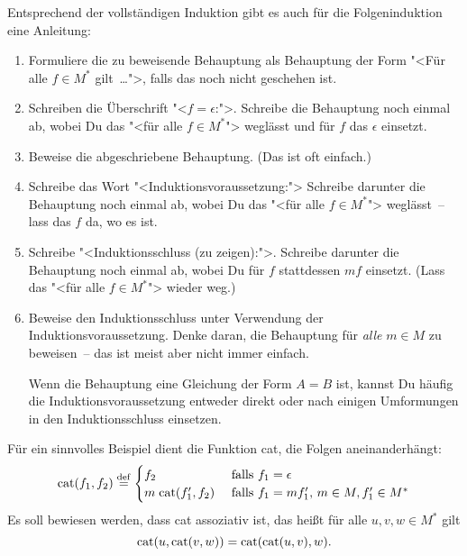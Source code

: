 Entsprechend der vollständigen Induktion gibt es auch für die
Folgeninduktion eine Anleitung:
%
\begin{enumerate}
\item Formuliere die zu beweisende Behauptung als Behauptung der
  Form "<Für alle $f\in M^\ast$ gilt~\ldots">, falls das noch nicht
  geschehen ist.
\item Schreiben die Überschrift "<$f = \epsilon$:">. Schreibe die
  Behauptung noch einmal ab, wobei Du das "<für alle $f\in M^\ast$"> weglässt und für $f$ das $\epsilon$ einsetzt.
\item Beweise die abgeschriebene Behauptung.  (Das ist oft
  einfach.)
\item Schreibe das Wort "<Induktionsvoraussetzung:"> Schreibe
  darunter die Behauptung noch einmal ab, wobei Du das "<für
  alle $f\in M^\ast$"> weglässt~-- lass das $f$ da, wo es ist.
\item Schreibe "<Induktionsschluss (zu zeigen):">.
  Schreibe darunter die Behauptung noch einmal ab, wobei Du für
  $f$ stattdessen $mf$ einsetzt.  (Lass das "<für alle
  $f\in M^\ast$"> wieder weg.)
\item Beweise den Induktionsschluss unter Verwendung der
  Induktionsvoraussetzung.  Denke daran, die Behauptung für
  \emph{alle} $m\in M$ zu beweisen~-- das ist meist aber nicht immer
  einfach.

  Wenn die Behauptung eine Gleichung der Form $A = B$ ist, kannst
  Du häufig die Induktionsvoraussetzung entweder direkt oder nach
  einigen Umformungen in den Induktionsschluss einsetzen.
\end{enumerate}
%
Für ein sinnvolles Beispiel dient die Funktion cat, die Folgen
aneinanderhängt:
%
\begin{displaymath}
  \textrm{cat}(f_1, f_2)
  \stackrel{\rm def}{=}
  \begin{cases}
    f_2 & \textrm{ falls $f_1 = \epsilon$}\\
    m\;\textrm{cat}(f_1', f_2)& \textrm{ falls $f_1 = mf_1'$, $m\in M, f_1'\in M^\ast$}
  \end{cases}
\end{displaymath}
Es soll bewiesen werden, dass cat assoziativ\label{Assoziativität} ist, das heißt für alle 
$u,v,w \in M^{\ast}$ gilt
\begin{displaymath}
  {\rm cat}(u,{\rm cat}(v,w))  = {\rm cat}({\rm cat}(u,v),w).
\end{displaymath}
% 
